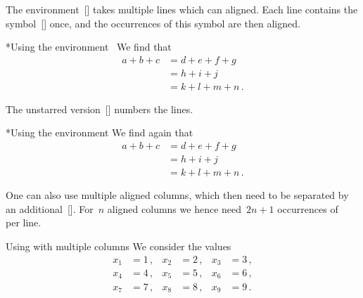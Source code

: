 The environment~[\envname] takes multiple lines which can aligned.
Each line contains the symbol~\inlinecode{\&}\massindex{\&}[\inlinecode] once, and the occurrences of this symbol are then aligned.
\begin{showlatex}*{Using the environment~}
We find that
\begin{align*}
  a + b + c
  &=
  d + e + f + g
  \\
  &=
  h + i + j
  \\
  &=
  k + l + m + n \,.
\end{align*}
\end{showlatex}
The unstarred version~[\envname] numbers the lines.
\begin{showlatex}*{Using the environment }
We find again that
\begin{align}
  a + b + c
  &=
  d + e + f + g
  \\
  &=
  h + i + j
  \\
  &=
  k + l + m + n \,.
\end{align}
\end{showlatex}
One can also use multiple aligned columns, which then need to be separated by an additional~\inlinecode{\&}\massindex{\&}[\inlinecode].
For~$n$ aligned columns we hence need~$2n+1$ occurrences of~\inlinecode{\&} per line.
\begin{showlatex}{Using  with multiple columns}
We consider the values
\begin{align*}
  x_1 &= 1 \,,  &   x_2 &= 2 \,,  &   x_3 &= 3 \,,  \\
  x_4 &= 4 \,,  &   x_5 &= 5 \,,  &   x_6 &= 6 \,,  \\
  x_7 &= 7 \,,  &   x_8 &= 8 \,,  &   x_9 &= 9 \,.
\end{align*}
\end{showlatex}

